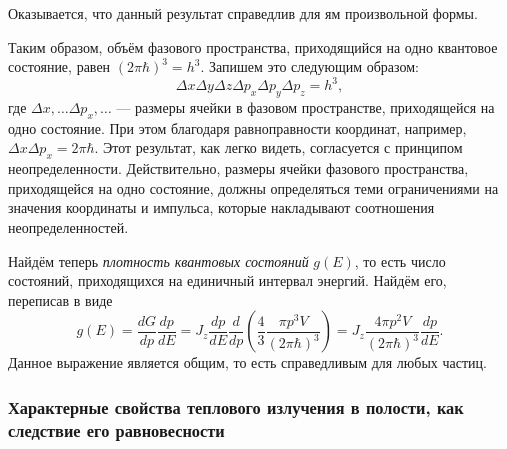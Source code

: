 Оказывается, что данный результат справедлив для ям произвольной формы.

Таким образом, объём фазового пространства, приходящийся на одно квантовое
состояние, равен $ (2\pi\hbar)^3 = h^3 $. Запишем это следующим образом: 
\[
  \Delta x \Delta y \Delta z \Delta p_x \Delta p_y \Delta p_z = h^3,
\]
где $ \Delta x, \ldots \Delta p_x, \ldots $ --- размеры ячейки в фазовом пространстве, приходящейся
на одно состояние. При этом благодаря равноправности координат, например, $
\Delta x \Delta
p_x = 2\pi \hbar$. Этот результат, как легко видеть, согласуется с принципом 
неопределенности. Действительно, размеры ячейки фазового 
пространства, приходящейся на одно состояние, должны определяться
теми ограничениями на значения координаты и импульса, которые
накладывают соотношения неопределенностей.

Найдём теперь \emph{плотность квантовых состояний} $ g(E) $, то есть число
состояний, приходящихся на единичный интервал энергий. Найдём его, переписав в
виде 
\[
  g(E)  = \frac{dG}{dp} \frac{dp}{dE} = J_z \frac{dp}{dE} \frac{d}{dp} \left(
  \frac{4}{3} \frac{\pi p^3 V}{(2\pi \hbar)^3}\right) = J_z \frac{4\pi p^2
  V}{(2\pi\hbar)^3} \frac{dp}{dE}.
\]
Данное выражение является общим, то есть справедливым для любых частиц.

\subsubsection{Характерные свойства теплового излучения в полости, как следствие его равновесности}

